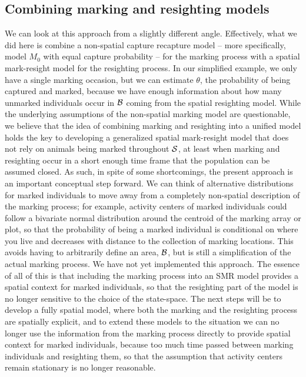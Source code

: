 \subsection{Combining marking and resighting models}
We can look at this approach from a slightly different angle. Effectively, what we did here is combine a non-spatial capture recapture model -- more specifically, model $M_0$ with equal capture probability -- for the marking process with a spatial mark-resight model for the resighting process. In our simplified example, we only have a single marking occasion, but we can estimate $\theta$, the probability of being captured and marked, because we have enough information about how many unmarked individuals occur in ${\cal B}$ coming from the spatial resighting model. While the underlying assumptions of the non-spatial marking model are questionable, we believe that the idea of combining marking and resighting into a unified model holds the key to developing a generalized spatial mark-resight model that does not rely on animals being marked throughout ${\cal S}$, at least when marking and resighting occur in a short enough time frame that the population can be assumed closed. As such, in spite of some shortcomings, the present approach is an important conceptual step forward. We can think of alternative distributions for marked individuals to move away from a completely non-spatial description of the marking process; for example, activity centers of marked individuals could follow a bivariate normal distribution around the centroid of the marking array or plot, so that the probability of being a marked individual is conditional on where you live and decreases with distance to the collection of marking locations. This avoids having to arbitrarily define an area, ${\cal B}$, but is still a simplification of the actual marking process. We have not yet implemented this approach.
The essence of all of this is that including the marking process into an SMR model provides a spatial context for marked individuals, so that the resighting part of the model is no longer sensitive to the choice of the state-space. The next steps will be to develop a fully spatial model, where both the marking and the resighting process are spatially explicit, and to extend these models to the situation we can no longer use the information from the marking process directly to provide spatial context for marked individuals, because too much time passed between marking individuals and resighting them, so that the assumption that activity centers remain stationary is no longer reasonable.


